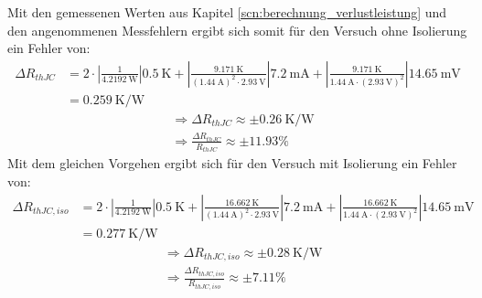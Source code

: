 Mit den gemessenen Werten aus Kapitel \ref{scn:berechnung_verlustleistung} und den angenommenen Messfehlern ergibt sich somit für den Versuch ohne Isolierung ein Fehler von:
\begin{align*}
    \Delta R_{thJC} & = 2 \cdot \left| \frac{1}{\SI{4.2192}{\watt}} \right| \SI{0.5}{\kelvin} + \left| \frac{\SI{9.171}{\kelvin}}{(\SI{1.44}{\ampere})^2 \cdot \SI{2.93}{\volt}} \right| \SI{7.2}{\milli\ampere} + \left| \frac{\SI{9.171}{\kelvin}}{\SI{1.44}{\ampere} \cdot (\SI{2.93}{\volt})^2} \right| \SI{14.65}{\milli\volt} \\
                    & = \boxed{\SI{0.259}{\kelvin\per\watt}}
\end{align*}
\begin{align*}
     & \Rightarrow \Delta R_{thJC} \approx \pm \SI{0.26}{\kelvin\per\watt} \\
     & \Rightarrow \frac{\Delta R_{thJC}}{R_{thJC}} \approx \pm 11.93\%          %
\end{align*}
Mit dem gleichen Vorgehen ergibt sich für den Versuch mit Isolierung ein Fehler von:
\begin{align*}
    \Delta R_{thJC, iso} & = 2 \cdot \left| \frac{1}{\SI{4.2192}{\watt}} \right| \SI{0.5}{\kelvin} + \left| \frac{\SI{16.662}{\kelvin}}{(\SI{1.44}{\ampere})^2 \cdot \SI{2.93}{\volt}} \right| \SI{7.2}{\milli\ampere} + \left| \frac{\SI{16.662}{\kelvin}}{\SI{1.44}{\ampere} \cdot (\SI{2.93}{\volt})^2} \right| \SI{14.65}{\milli\volt} \\
                         & = \boxed{\SI{0.277}{\kelvin\per\watt}}
\end{align*}\begin{align*}
     & \Rightarrow \Delta R_{thJC, iso} \approx \pm \SI{0.28}{\kelvin\per\watt} \\
     & \Rightarrow \frac{\Delta R_{thJC, iso}}{R_{thJC, iso}} \approx \pm 7.11\%      %
\end{align*}